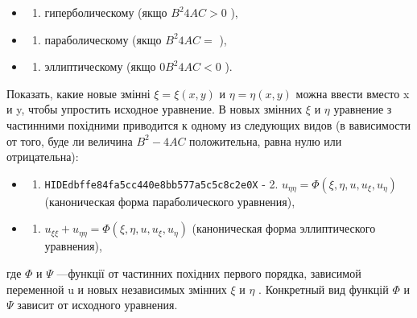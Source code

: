 \documentclass[
  ukrainian,
]{article}
\providecommand{\tightlist}{%
  \setlength{\itemsep}{0pt}\setlength{\parskip}{0pt}}
\begin{document}
\begin{itemize}
\tightlist
\item
  \begin{enumerate}
  \def\labelenumi{\arabic{enumi})}
  \tightlist
  \item
    гиперболическому (якщо \(B^2 4AC > 0\) ),
  \end{enumerate}
\item
  \begin{enumerate}
  \def\labelenumi{\arabic{enumi})}
  \setcounter{enumi}{1}
  \tightlist
  \item
    параболическому (якщо \(B^2 4AC =\) ),
  \end{enumerate}
\item
  \begin{enumerate}
  \def\labelenumi{\arabic{enumi})}
  \setcounter{enumi}{2}
  \tightlist
  \item
    эллиптическому (якщо \(0 B^2 4AC < 0\) ).
  \end{enumerate}
\end{itemize}

Показать, какие новые змінні \(\xi = \xi(x, y)\) и \(\eta = \eta(x, y)\)
можна ввести вместо x и y, чтобы упростить исходное уравнение. В новых
змінних \(\xi\) и \(\eta\) уравнение з частинними похідними приводится к
одному из следующих видов (в вависимости от того, буде ли величина
\(B^2 - 4AC\) положительна, равна нулю или отрицательна):

\begin{itemize}
\tightlist
\item
  \begin{enumerate}
  \def\labelenumi{\arabic{enumi}.}
  \tightlist
  \item
    \texttt{HIDEdbffe84fa5cc440e8bb577a5c5c8c2e0X} - 2.
    \(u_{\eta\eta} = \Phi(\xi, \eta, u, u_{\xi}, u_{\eta})\)
    (каноническая форма параболического уравнения),
  \end{enumerate}
\item
  \begin{enumerate}
  \def\labelenumi{\arabic{enumi}.}
  \setcounter{enumi}{2}
  \tightlist
  \item
    \(u_{\xi\xi} + u_{\eta\eta} = \Phi(\xi, \eta, u, u_{\xi}, u_{\eta})\)
    (каноническая форма эллиптического уравнения),
  \end{enumerate}
\end{itemize}

где \(\Phi\) и \(\Psi\) ---функції от частинних похідних первого
порядка, зависимой переменной u и новых независимых змінних \(\xi\) и
\(\eta\) . Конкретный вид функцій \(\Phi\) и \(\Psi\) зависит от
исходного уравнения.
\end{document}
